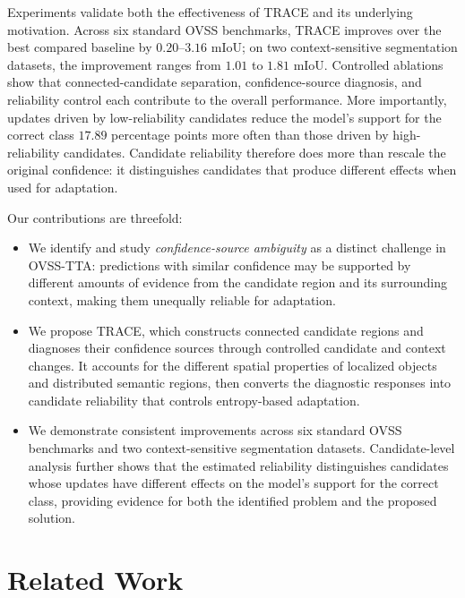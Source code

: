 \documentclass[letterpaper]{article}
\newcommand{\method}{TRACE\xspace}
\begin{document}
	Experiments validate both the effectiveness of \method and its underlying motivation. Across six standard OVSS benchmarks, \method improves over the best compared baseline by $0.20$--$3.16$ mIoU; on two context-sensitive segmentation datasets, the improvement ranges from $1.01$ to $1.81$ mIoU. Controlled ablations show that connected-candidate separation, confidence-source diagnosis, and reliability control each contribute to the overall performance. More importantly, updates driven by low-reliability candidates reduce the model's support for the correct class $17.89$ percentage points more often than those driven by high-reliability candidates. Candidate reliability therefore does more than rescale the original confidence: it distinguishes candidates that produce different effects when used for adaptation.
	
	Our contributions are threefold:
	\begin{itemize}
		\item We identify and study \emph{confidence-source ambiguity} as a distinct challenge in OVSS-TTA: predictions with similar confidence may be supported by different amounts of evidence from the candidate region and its surrounding context, making them unequally reliable for adaptation.
		
		\item We propose \method, which constructs connected candidate regions and diagnoses their confidence sources through controlled candidate and context changes. It accounts for the different spatial properties of localized objects and distributed semantic regions, then converts the diagnostic responses into candidate reliability that controls entropy-based adaptation.
		
		\item We demonstrate consistent improvements across six standard OVSS benchmarks and two context-sensitive segmentation datasets. Candidate-level analysis further shows that the estimated reliability distinguishes candidates whose updates have different effects on the model's support for the correct class, providing evidence for both the identified problem and the proposed solution.
	\end{itemize}
	
	\section{Related Work}
	
	
	
\end{document}
